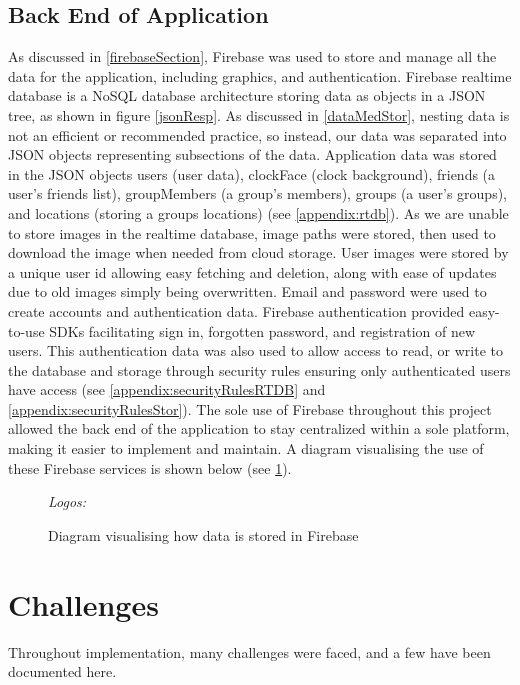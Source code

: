\subsection{Back End of Application}
As discussed in \ref{firebaseSection}, Firebase was used to store and manage all the data for the application, including graphics, and authentication. Firebase realtime database is a NoSQL database architecture storing data as objects in a JSON tree, as shown in figure \ref{jsonResp}. As discussed in \ref{dataMedStor}, nesting data is not an efficient or recommended practice, so instead, our data was separated into JSON objects representing subsections of the data. Application data was stored in the JSON objects users (user data), clockFace (clock background), friends (a user's friends list), groupMembers (a group's members), groups (a user's groups), and locations (storing a groups locations) (see \ref{appendix:rtdb}). As we are unable to store images in the realtime database, image paths were stored, then used to download the image when needed from cloud storage. User images were stored by a unique user id allowing easy fetching and deletion, along with ease of updates due to old images simply being overwritten. Email and password were used to create accounts and authentication data. Firebase authentication provided easy-to-use SDKs facilitating sign in, forgotten password, and registration of new users. This authentication data was also used to allow access to read, or write to the database and storage through security rules ensuring only authenticated users have access (see \ref{appendix:securityRulesRTDB} and \ref{appendix:securityRulesStor}). The sole use of Firebase throughout this project allowed the back end of the application to stay centralized within a sole platform, making it easier to implement and maintain. A diagram visualising the use of these Firebase services is shown below (see \ref{fig:firebaseDiag}).
\begin{figure}[!htbp]
    \centering
    \begin{subfigure}[b]{\textwidth}
    \end{subfigure}
    \caption{Diagram visualising how data is stored in Firebase} \small\textit{{Logos: \cite{storImg, rtdbImg, authImg}}}
    \label{fig:firebaseDiag}
\end{figure}
\FloatBarrier
\section{Challenges}
Throughout implementation, many challenges were faced, and a few have been documented here.

